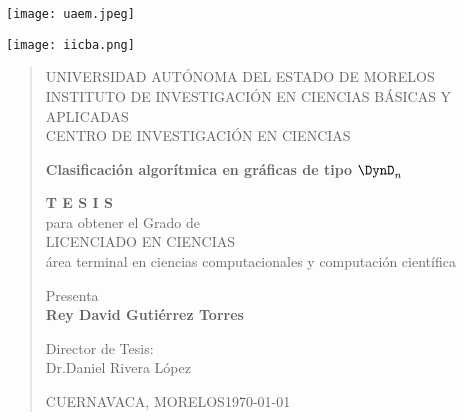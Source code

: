 \begin{titlepage}

\begin{minipage}{0.2\textwidth}
	\begin{center} 
		\texttt{[image: uaem.jpeg]}\\ %
	\end{center}
\end{minipage}
\hspace{7cm}
\begin{minipage}{0.2\textwidth}
	\begin{center}
		\texttt{[image: iicba.png]}\\ %
	\end{center}
\end{minipage}
\vspace{24pt}

\begin{quote}	
\begin{center}
 UNIVERSIDAD AUTÓNOMA DEL ESTADO DE MORELOS\\
INSTITUTO DE INVESTIGACIÓN EN CIENCIAS BÁSICAS Y APLICADAS\\
CENTRO DE INVESTIGACIÓN EN CIENCIAS
\end{center}
\vspace{24pt}
\begin{center}
\Large \textbf{Clasificación algorítmica en gráficas de tipo $\DynD_{n}$}
\end{center}
\vspace{24pt}
\begin{center}
\Large \textbf{T E S I S}\\
\normalsize para obtener el Grado de\\
\Large LICENCIADO EN CIENCIAS\\
\normalsize área terminal en ciencias computacionales y computación científica
\end{center}
\vspace{24pt}
\begin{center}
Presenta\\
\Large \textbf{Rey David Gutiérrez Torres}
\end{center}

\vspace{24pt}
\begin{center}
Director de Tesis:\\
\large Dr.Daniel Rivera López
\end{center}

\vspace{40pt}
\begin{center}
\normalsize CUERNAVACA, MORELOS\today
\end{center}

\end{quote}

\newpage
\end{titlepage}


